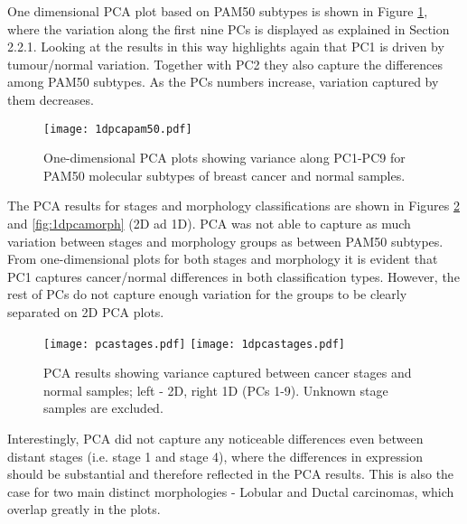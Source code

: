     \newpage
    One dimensional PCA plot based on PAM50 subtypes is shown in Figure \ref{fig:1dpcapam50}, where the variation along the first nine PCs is displayed as explained in Section 2.2.1. Looking at the results in this way highlights again that PC1 is driven by tumour/normal variation. Together with PC2 they also capture the differences among PAM50 subtypes. As the PCs numbers increase, variation captured by them decreases. 
    
            \begin{figure}[!h]
            \centering
            \texttt{[image: 1dpcapam50.pdf]}
            \caption[PCA plot showing separation by PAM50 subtypes (1D)]{One-dimensional PCA plots showing variance along PC1-PC9 for PAM50 molecular subtypes of breast cancer and normal samples. }
            \label{fig:1dpcapam50}
            \end{figure}
    
    
    The PCA results for stages and morphology classifications are shown in Figures \ref{fig:1dpcastage} and \ref{fig:1dpcamorph} (2D ad 1D). PCA was not able to capture as much variation between stages and morphology groups as between PAM50 subtypes. From one-dimensional plots for both stages and morphology it is evident that PC1 captures cancer/normal differences in both classification types. However, the rest of PCs do not capture enough variation for the groups to be clearly separated on 2D PCA plots. 
    
            
            \begin{figure}[!h]
            \hspace*{\fill}
            \texttt{[image: pcastages.pdf]}\hfill
            \texttt{[image: 1dpcastages.pdf]}
            \hspace*{\fill}
            \caption[PCA plots (2D and 1D) showing separation by cancer stages]{PCA results showing variance captured between cancer stages and normal samples; left - 2D, right 1D (PCs 1-9). Unknown stage samples are excluded.}
            \label{fig:1dpcastage}
            \end{figure}
            
        Interestingly, PCA did not capture any noticeable differences even between distant stages (i.e. stage 1 and stage 4), where the differences in expression should be substantial and therefore reflected in the PCA results. This is also the case for two main distinct morphologies - Lobular and Ductal carcinomas, which overlap greatly in the plots.
    
